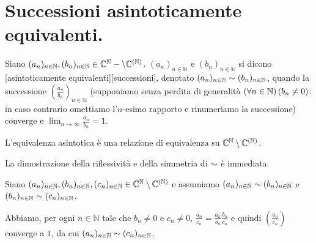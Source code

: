 \section{Successioni asintoticamente equivalenti.}
\label{TeoriaDelleSuccessioniEDelleSerie_SuccessioniAsintoticamenteEquivalenti}
\begin{Definition}
	Siano $(a_n)_{n \in \mathbb{N}}, (b_n)_{n \in \mathbb{N}} \in \mathbb{C}^\mathbb{N} - \setminus \mathbb{C}^{(\mathbb{N})}$. $(a_n)_{n \in \mathbb{N}}$ e $(b_n)_{n \in \mathbb{N}}$ si dicono [asintoticamente equivalenti][successioni], denotato $(a_n)_{n \in \mathbb{N}} \sim (b_n)_{n \in \mathbb{N}}$, quando la successione $(\frac{a_n}{b_n})_{n \in \mathbb{N}}$ (supponiamo senza perdita di generalit\`a $\left ( \forall n \in \mathbb{N} \right ) \left ( b_n \neq 0 \right )$: in caso contrario omettiamo l'$n$-esimo rapporto e rinumeriamo la successione) converge e $\lim_{n \rightarrow \infty} \frac{a_n}{b_n} = 1$.
\end{Definition}
\begin{Theorem}
	L'equivalenza asintotica \`e una relazione di equivalenza su $\mathbb{C}^\mathbb{N} \setminus \mathbb{C}^{(\mathbb{N})}$.
\end{Theorem}
\Proof La dimostrazione della riflessivit\`a e della simmetria di $\sim$ \`e immediata.
\par Siano $(a_n)_{n \in \mathbb{N}}, (b_n)_{n \in \mathbb{N}}, (c_n)_{n \in \mathbb{N}} \in \mathbb{C}^\mathbb{N} \setminus \mathbb{C}^{(\mathbb{N})}$ e assumiamo $(a_n)_{n \in \mathbb{N}} \sim (b_n)_{n \in \mathbb{N}}$ e $(b_n)_{n \in \mathbb{N}} \sim (c_n)_{n \in \mathbb{N}}$.
\par Abbiamo, per ogni $n \in \mathbb{N}$ tale che $b_n \neq 0$ e $c_n \neq 0$, $\frac{a_n}{c_n} = \frac{a_n}{b_n}\frac{b_n}{c_n}$ e quindi $\left ( \frac{a_n}{c_n} \right )$ converge a $1$, da cui $(a_n)_{n \in \mathbb{N}} \sim (c_n)_{n \in \mathbb{N}}$. \EndProof
